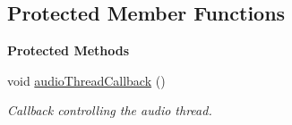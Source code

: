 \subsection*{Protected Member Functions}
\begin{Indent}\textbf{ Protected Methods}\par
\begin{DoxyCompactItemize}
\item 
\mbox{\label{classrev_1_1_sound_manager_a149fafb76f4c64acfabce60b2b3f27ad}} 
void \mbox{\hyperlink{classrev_1_1_sound_manager_a149fafb76f4c64acfabce60b2b3f27ad}{audio\+Thread\+Callback}} ()
\begin{DoxyCompactList}\small\item\em Callback controlling the audio thread. \end{DoxyCompactList}\end{DoxyCompactItemize}
\end{Indent}

